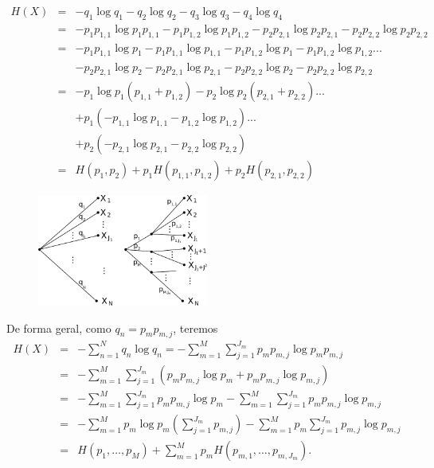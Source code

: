 \begin{frame}[allowframebreaks]
\begin{example}
  \examplebreak
  \vspace{-2ex}
  \begin{eqnarray}
  H(X)  &=& - q_1 \log q_1 - q_2 \log q_2 - q_3 \log q_3  - q_4 \log q_4 \nonumber \\
        &=& - p_1 p_{1,1} \log p_1 p_{1,1} - p_1 p_{1,2} \log p_1 p_{1,2} - p_2 p_{2,1} \log p_2 p_{2,1} - p_2 p_{2,2} \log p_2 p_{2,2} \nonumber \\
        &=& - p_1 p_{1,1} \log p_1 - p_1 p_{1,1} \log p_{1,1} - p_1 p_{1,2} \log p_1 - p_1 p_{1,2} \log p_{1,2} ... \nonumber \\
        && - p_2 p_{2,1} \log p_2 - p_2 p_{2,1} \log p_{2,1} - p_2 p_{2,2} \log p_2  - p_2 p_{2,2} \log p_{2,2} \nonumber \\
        &=& - p_1 \log p_1 \left( p_{1,1} + p_{1,2} \right) - p_2 \log p_2 \left( p_{2,1} + p_{2,2} \right) ... \nonumber \\
        && + p_1 \left( - p_{1,1} \log p_{1,1} - p_{1,2} \log p_{1,2} \right) ... \nonumber \\
        && + p_2 \left( - p_{2,1} \log p_{2,1} - p_{2,2} \log p_{2,2} \right)  \nonumber \\
        &=& H(p_1, p_2) + p_1 H(p_{1,1}, p_{1,2}) + p_2 H(p_{2,1}, p_{2,2}) 
  \end{eqnarray} 
  \end{example}

  \framebreak

        \begin{figure}[h!]
        \centering
        \includegraphics[width=0.5\textwidth]{images/choicesM.pdf}
        \label{fig:choicesM}
        \end{figure} 

  De forma geral, como $q_n = p_m p_{m,j}$, teremos
  \begin{eqnarray}
  H(X) &=& - \sum_{n=1}^N q_n \log q_n = - \sum_{m=1}^M \sum_{j=1}^{J_m} p_m p_{m,j} \log p_m p_{m,j} \nonumber \\
        &=& - \sum_{m=1}^M \sum_{j=1}^{J_m} \left( p_m p_{m,j} \log p_m + p_m p_{m,j} \log p_{m,j} \right) \nonumber \\
        &=& - \sum_{m=1}^M \sum_{j=1}^{J_m} p_m p_{m,j} \log p_m - \sum_{m=1}^M \sum_{j=1}^{J_m} p_m p_{m,j} \log p_{m,j} \nonumber \\
        &=& - \sum_{m=1}^M p_m \log p_m \left( \sum_{j=1}^{J_m} p_{m,j} \right) - \sum_{m=1}^M p_m \sum_{j=1}^{J_m} p_{m,j} \log p_{m,j} \nonumber \\
        &=& H(p_1, \ldots, p_M) + \sum_{m=1}^M p_m H(p_{m,1}, \ldots, p_{m,J_m}) .
  \end{eqnarray}
  
\end{frame}

